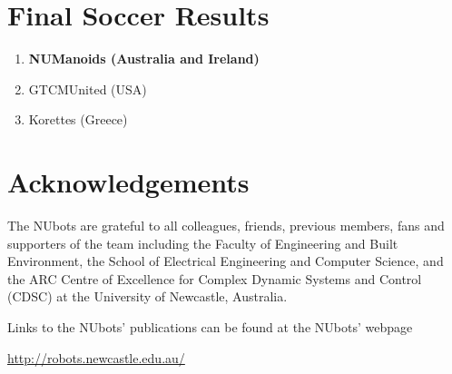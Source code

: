 \section{Final Soccer Results}

\begin{enumerate}
    \item \textbf{NUManoids (Australia and Ireland)}
    \item GTCMUnited (USA)
    \item Korettes (Greece)
\end{enumerate}

\section{Acknowledgements}
 \noindent The NUbots are grateful to all colleagues, friends, previous members, fans and supporters of the team including  the Faculty of Engineering and Built Environment, the School of Electrical Engineering and Computer Science, and the ARC Centre of Excellence for Complex Dynamic Systems and Control (CDSC) at the University of Newcastle, Australia.

\noindent Links to the NUbots' publications can be found at the NUbots' webpage
\begin{center}
\url{http://robots.newcastle.edu.au/}
\end{center}
